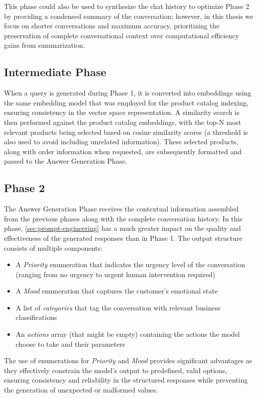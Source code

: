 This phase could also be used to synthesize the chat history to optimize Phase 2 by providing a condensed summary of the conversation; however, in this thesis we focus on shorter conversations and maximum accuracy, prioritizing the preservation of complete conversational context over computational efficiency gains from summarization.

\subsection{Intermediate Phase}

When a query is generated during Phase 1, it is converted into embeddings using the same embedding model that was employed for the product catalog indexing, ensuring consistency in the vector space representation.
A similarity search is then performed against the product catalog embeddings, with the top-N most relevant products being selected based on cosine similarity scores (a threshold is also used to avoid including unrelated information).
These selected products, along with order information when requested, are subsequently formatted and passed to the Answer Generation Phase.

\subsection{Phase 2}

The Answer Generation Phase receives the contextual information assembled from the previous phases along with the complete conversation history.
In this phase, \cref{sec:prompt-engineering} has a much greater impact on the quality and effectiveness of the generated responses than in Phase 1.
The output structure consists of multiple components:
\begin{itemize}
    \item A \textit{Priority} enumeration that indicates the urgency level of the conversation (ranging from no urgency to urgent human intervention required)
    \item A \textit{Mood} enumeration that captures the customer's emotional state
    \item A list of \textit{categories} that tag the conversation with relevant business classifications
    \item An \textit{actions} array (that might be empty) containing the actions the model choose to take and their parameters
\end{itemize}
The use of enumerations for \textit{Priority} and \textit{Mood} provides significant advantages as they effectively constrain the model's output to predefined, valid options, ensuring consistency and reliability in the structured responses while preventing the generation of unexpected or malformed values.

